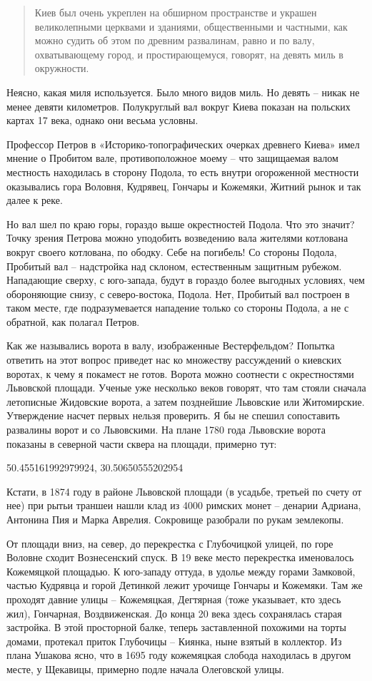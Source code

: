 \begin{quotation}
Киев был очень укреплен на обширном пространстве и украшен великолепными церквами и зданиями, общественными и частными, как можно судить об этом по древним развалинам, равно и по валу, охватывающему город, и простирающемуся, говорят, на девять миль в окружности.
\end{quotation}

Неясно, какая миля используется. Было много видов миль. Но девять – никак не менее девяти километров. Полукруглый вал вокруг Киева показан на польских картах 17 века, однако они весьма условны.

Профессор Петров в «Историко-топографических оче\-рках древнего Киева»\cite{petrov01} имел мнение о Пробитом вале, противоположное моему – что защищаемая валом местность находилась в сторону Подола, то есть внутри огороженной местности оказывались гора Воловня, Кудрявец, Гончары и Кожемяки, Житний рынок и так далее к реке. 

Но вал шел по краю горы, гораздо выше окрестностей Подола. Что это значит? Точку зрения Петрова можно уподобить возведению вала жителями котлована вокруг своего котлована, по ободку. Себе на погибель! Со стороны Подола, Пробитый вал – надстройка над склоном, естественным защитным рубежом. Нападающие сверху, с юго-запада, будут в гораздо более выгодных условиях, чем обороняющие снизу, с северо-востока, Подола. Нет, Пробитый вал построен в таком месте, где подразумевается нападение только со стороны Подола, а не с обратной, как полагал Петров.
 
Как же назывались ворота в валу, изображенные Вестерфельдом? Попытка ответить на этот вопрос приведет нас ко множеству рассуждений о киевских воротах, к чему я покамест не готов. Ворота можно соотнести с окрестностями Львовской площади. Ученые уже несколько веков говорят, что там стояли сначала летописные Жидовские ворота, а затем позднейшие Львовские или Житомирские. Утверждение насчет первых нельзя проверить. Я бы не спешил сопоставить развалины ворот и со Львовскими. На плане 1780 года Львовские ворота показаны в северной части сквера на площади, примерно тут:

50.455161992979924, 30.50650555202954

Кстати, в 1874 году в районе Львовской площади (в усадьбе, третьей по счету от нее) при рытьи траншеи нашли клад из 4000 римских монет – денарии Адриана, Антонина Пия и Марка Аврелия. Сокровище разобрали по рукам землекопы.

От площади вниз, на север, до перекрестка с Глубочицкой улицей, по горе Воловне сходит Вознесенский спуск. В 19 веке место перекрестка именовалось Кожемяцкой площадью. К юго-западу оттуда, в удолье между горами Замковой, частью Кудрявца и горой Детинкой лежит урочище Гончары и Кожемяки. Там же проходят давние улицы – Кожемяцкая, Дегтярная (тоже указывает, кто здесь жил), Гончарная, Воздвиженская. До конца 20 века здесь сохранялась старая застройка. В этой просторной балке, теперь заставленной похожими на торты домами, протекал приток Глубочицы – Киянка, ныне взятый в коллектор. Из плана Ушакова ясно, что в 1695 году кожемяцкая слобода находилась в другом месте, у Щекавицы, примерно подле начала Олеговской улицы.

